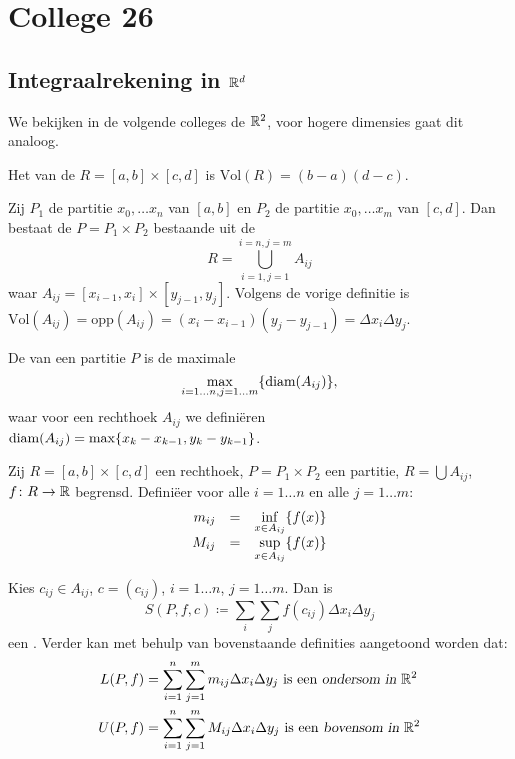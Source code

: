 \documentclass{2wa40summary}
\newcommand\ds{\displaystyle}
\def\diam{\text{diam}}
\begin{document}
		\newpage
		\section{College 26}
		\subsection{Integraalrekening in $\mathbb{R}^d$}
			We bekijken in de volgende colleges de $\reals^2$, voor hogere dimensies gaat dit analoog.
			\begin{define}
				Het  van de  $R =[a,b]\times[c,d]$ is  $\text{Vol}(R) = (b-a)(d-c)$.
			\end{define}
\begin{theorem}
Zij $P_1$ de partitie $x_0,\ldots x_n$ van $[a,b]$ en
$P_2$ de partitie $x_0,\ldots x_m$ van $[c,d]$.
Dan bestaat de  $P=P_1 \times P_2$ bestaande uit de 
\[
R = \bigcup_{i=1,j=1}^{i=n,j=m} A_{ij}
\]
waar $A_{ij}=[x_{i-1},x_i] \times [y_{j-1},y_j]$.
Volgens de vorige definitie is $\text{Vol}(A_{ij})=\text{opp}(A_{ij})=(x_i-x_{i-1})(y_j-y_{j-1}) = \Delta x_i \Delta y_j$.
\end{theorem}
			\begin{define}
				De  van een partitie $P$ is de maximale \indx{diameter}
\[
\max_{i=1\ldots n,j=1\ldots m}\set{\diam(A_{ij})},
\]
waar voor een rechthoek $A_{ij}$ we defini\"eren $\diam(A_{ij}) = \max\set{x_k-x_{k-1},y_k-y_{k-1}}$. %

			\end{define}
			\begin{define}
				Zij $R=[a,b]\times[c,d]$ een rechthoek, $P=P_1 \times P_2$ een partitie, $R=\bigcup A_{ij}$, $f\colon R \to \mathbb{R}$ begrensd.
				Defini\"eer voor alle $i=1 \ldots n$ en alle $j=1 \ldots m$:
				\[
					\begin{array}{rcl}
						m_{ij} &=& \ds\inf_{x \in A_{ij}}\set{f(x)}\\
						M_{ij} &=& \ds\sup_{x \in A_{ij}}\set{f(x)}
					\end{array}
				\]
			\end{define}
			\begin{define}
				Kies $c_{ij} \in A_{ij}$, $c=(c_{ij})$, $i=1 \ldots n$, $j=1 \ldots m$. Dan is 
				\[ 
					S(P,f,c) \coloneqq  \sum_i \sum_j f(c_{ij}) \Delta x_i \Delta y_j
				 \]
				 een \indx{Riemannsom in $\reals^2$}.
Verder kan met behulp van bovenstaande definities aangetoond worden dat:
				\begin{align*}
					L(P,f) &= \sum_{i=1}^{n} \sum_{j=1}^{m} m_{ij} \Delta x_i \Delta y_j \text{ is een \indx{ondersom in $\reals^2$}} \\
					U(P,f) &= \sum_{i=1}^{n} \sum_{j=1}^{m} M_{ij} \Delta x_i \Delta y_j \text{ is een \indx{bovensom in $\reals^2$}}
				 \end{align*}
				 
			\end{define}
\end{document}
